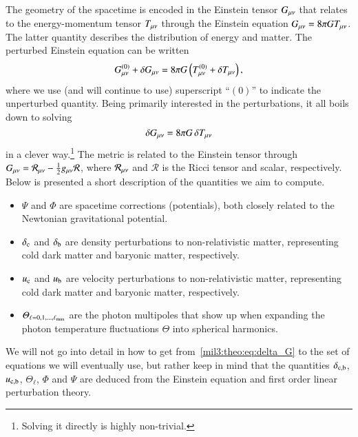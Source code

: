 



The geometry of the spacetime is encoded in the Einstein tensor $G_{\mu \nu}$ that relates to the energy-momentum tensor $T_{\mu \nu}$ through the Einstein equation $G_{\mu \nu} = 8\pi G T_{\mu \nu}$. The latter quantity describes the distribution of energy and matter. The perturbed Einstein equation can be written
\begin{equation}
    G^{(0)}_{\mu \nu} +\delta G_{\mu \nu} = 8\pi G \left( T^{(0)}_{\mu \nu}+\delta T_{\mu \nu} \right),
\end{equation}
where we use (and will continue to use) superscript ``$(0)$'' to indicate the unperturbed quantity. Being primarily interested in the perturbations, it all boils down to solving
\begin{equation}\label{mil3:theo:eq:delta_G}
    \delta G_{\mu \nu} = 8\pi G\, \delta T_{\mu \nu}
\end{equation}
in a clever way.\footnote{Solving it directly is highly non-trivial.} The metric is related to the Einstein tensor through $G_{\mu \nu}= \mathcal{R}_{\mu \nu} - \frac{1}{2}g_{\mu \nu} \mathcal{R}$, where $\mathcal{R}_{\mu \nu}$ and $\mathcal{R}$ is the Ricci tensor and scalar, respectively. 
Below is presented a short description of the quantities we aim to compute. 
\begin{itemize}
    \item $\Psi$ and $\Phi$ are spacetime corrections (potentials), both closely related to the Newtonian gravitational potential.
    \item $\delta_\mathrm{c}$ and $\delta_\mathrm{b}$ are density perturbations to non-relativistic matter, representing cold dark matter and baryonic matter, respectively.
    \item $u_\mathrm{c}$ and $u_\mathrm{b}$ are velocity perturbations to non-relativistic matter, representing cold dark matter and baryonic matter, respectively.
    \item $\varTheta_{\ell= 0, 1, \dots, \ell_\mathrm{max}}$ are the photon multipoles that show up when expanding the photon temperature fluctuations $\Theta$ into spherical harmonics.
\end{itemize}

We will not go into detail in how to get from~\cref{mil3:theo:eq:delta_G} to the set of equations we will eventually use, but rather keep in mind that the quantities $\delta_\mathrm{c,b}$, $u_\mathrm{c,b}$, $\Theta_\ell$, $\Phi$ and $\Psi$ are deduced from the Einstein equation and first order linear perturbation theory. 


